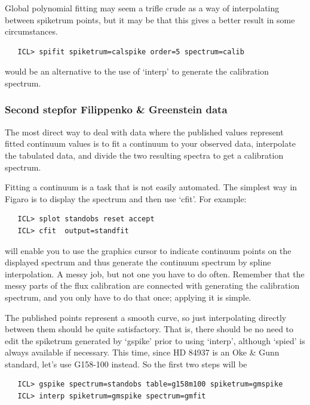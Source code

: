    Global polynomial fitting may seem a trifle crude as a way of
   interpolating between spiketrum points, but it may be that this gives
   a better result in some circumstances.

\begin{verbatim}
   ICL> spifit spiketrum=calspike order=5 spectrum=calib
\end{verbatim}

   would be an alternative to the use of `interp' to generate the
   calibration spectrum.


\subsubsection{\label{techno5fgsecond}Second step\latorhtm{---}{-}for
   Filippenko \& Greenstein data}

   The most direct way to deal with data where the published values
   represent fitted continuum values is to fit a continuum to your
   observed data, interpolate the tabulated data, and divide the two
   resulting spectra to get a calibration spectrum.

   Fitting a continuum is a task that is not easily automated.  The
   simplest way in Figaro is to display the spectrum and then use `cfit'.
   For example:

\begin{verbatim}
   ICL> splot standobs reset accept
   ICL> cfit  output=standfit
\end{verbatim}

   will enable you to use the graphics cursor to indicate continuum
   points on the displayed spectrum and thus generate the continuum
   spectrum by spline interpolation.  A messy job, but not one you have
   to do often. Remember that the messy parts of the flux calibration
   are connected with generating the calibration spectrum, and you only
   have to do that once; applying it is simple.

   The published points represent a smooth curve, so just interpolating
   directly between them should be quite satisfactory.  That is, there
   should be no need to edit the spiketrum generated by `gspike' prior
   to using `interp', although `spied' is always available if necessary.
   This time, since HD 84937 is an Oke \& Gunn standard, let's use
   G158-100 instead.  So the first two steps will be

\begin{verbatim}
   ICL> gspike spectrum=standobs table=g158m100 spiketrum=gmspike
   ICL> interp spiketrum=gmspike spectrum=gmfit
\end{verbatim}

